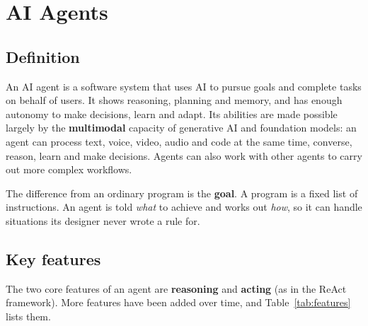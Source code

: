 \documentclass[11pt, a4paper]{article}
\begin{document}
\section{AI Agents}
\label{sec:agents}

\subsection{Definition}

An AI agent is a software system that uses AI to pursue goals and complete tasks on behalf of users. It shows reasoning, planning and memory, and has enough autonomy to make decisions, learn and adapt. Its abilities are made possible largely by the \textbf{multimodal} capacity of generative AI and foundation models: an agent can process text, voice, video, audio and code at the same time, converse, reason, learn and make decisions. Agents can also work with other agents to carry out more complex workflows.

The difference from an ordinary program is the \textbf{goal}. A program is a fixed list of instructions. An agent is told \emph{what} to achieve and works out \emph{how}, so it can handle situations its designer never wrote a rule for.

\subsection{Key features}

The two core features of an agent are \textbf{reasoning} and \textbf{acting} (as in the ReAct framework). More features have been added over time, and Table~\ref{tab:features} lists them.
\end{document}
